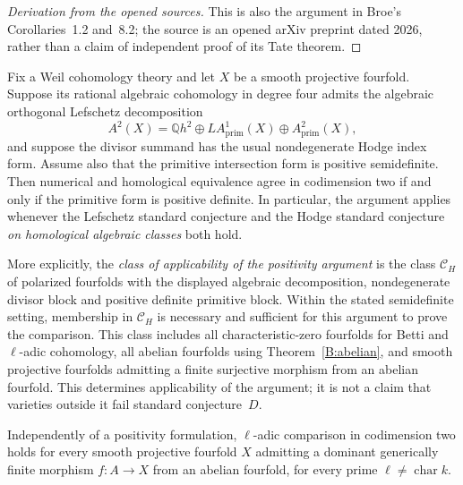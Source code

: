 \begin{proof}[Derivation from the opened sources]
This is also the argument in Broe's Corollaries~1.2 and~8.2; the source is an opened arXiv preprint dated 2026, rather than a claim of independent proof of its Tate theorem.
\end{proof}

\begin{theorem}\label{B:criterion}
Fix a Weil cohomology theory and let $X$ be a smooth projective fourfold. Suppose its rational algebraic cohomology in degree four admits the algebraic orthogonal Lefschetz decomposition
\[
 A^2(X)=\mathbb Qh^2\oplus L A^1_{\mathrm{prim}}(X)\oplus A^2_{\mathrm{prim}}(X),
\]
and suppose the divisor summand has the usual nondegenerate Hodge index form. Assume also that the primitive intersection form is positive semidefinite. Then numerical and homological equivalence agree in codimension two if and only if the primitive form is positive definite. In particular, the argument applies whenever the Lefschetz standard conjecture and the Hodge standard conjecture \emph{on homological algebraic classes} both hold.

More explicitly, the \emph{class of applicability of the positivity argument} is the class $\mathscr C_H$ of polarized fourfolds with the displayed algebraic decomposition, nondegenerate divisor block and positive definite primitive block. Within the stated semidefinite setting, membership in $\mathscr C_H$ is necessary and sufficient for this argument to prove the comparison. This class includes all characteristic-zero fourfolds for Betti and $\ell$-adic cohomology, all abelian fourfolds using Theorem~\ref{B:abelian}, and smooth projective fourfolds admitting a finite surjective morphism from an abelian fourfold. This determines applicability of the argument; it is not a claim that varieties outside it fail standard conjecture~$D$.

Independently of a positivity formulation, $\ell$-adic comparison in codimension two holds for every smooth projective fourfold $X$ admitting a dominant generically finite morphism $f:A\to X$ from an abelian fourfold, for every prime $\ell\ne\operatorname{char}k$.
\end{theorem}
